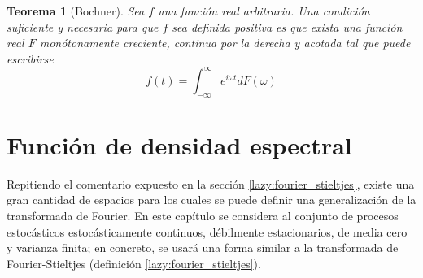\documentclass[12pt,letterpaper]{book}
\newtheorem{teorema}{Teorema}[chapter]
\newcommand{\R}{\mathbb{R}}
\newcommand{\C}{\mathbb{C}}
\newcommand{\intR}{\int_{-\infty}^{\infty}}
\newcommand{\abso}[1]{\left| #1 \right|}
\begin{document}
\begin{teorema}[Bochner]
Sea $f$ una función real arbitraria. Una condición suficiente y necesaria para que $f$ sea definida positiva es que exista una función real $F$ monótonamente creciente, continua por la derecha y acotada tal que puede escribirse
\begin{equation}
f(t) = \intR e^{i \omega t} dF(\omega)
\end{equation}
\end{teorema}



\section{Función de densidad espectral}
\label{sec:fde}

Repitiendo el comentario expuesto en la sección \ref{lazy:fourier_stieltjes}, existe una gran cantidad de espacios para los cuales se puede definir una generalización de la transformada de Fourier.
%
En este capítulo se considera al conjunto de procesos estocásticos estocásticamente continuos, débilmente estacionarios, de media cero y varianza finita; en concreto, se usará una forma similar a la transformada de Fourier-Stieltjes (definición \ref{lazy:fourier_stieltjes}).
\end{document}

